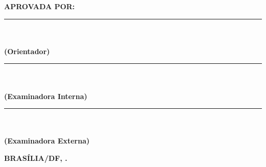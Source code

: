 \begin{folhadeaprovacao}
\begin{center}
	\vspace{10mm}
	{\large \textbf{\imprimirautor}}
\end{center}
 
\vspace{10mm}

\noindent
\MakeUppercase{\textbf{\imprimirpreambulo}}

\vspace{5mm}

\noindent
\MakeUppercase{\textbf{Aprovada por:}}

\vspace{10mm}

\noindent\rule{120mm}{0.1mm}\\
{\textbf{\imprimirorientador}}\\
{\textbf{\noindent (Orientador)}}

\vspace{7.5mm}

\noindent\rule{120mm}{0.1mm}\\
{\textbf{\imprimirmembroconvidadoum}}\\
{\textbf{\noindent (Examinadora Interna)}}

\vspace{7.5mm}

\noindent\rule{120mm}{0.1mm}\\
{\textbf{\imprimirmembroconvidadodois}}\\
{\textbf{\noindent (Examinadora Externa)}}



\vspace{7.5mm}
\noindent
\MakeUppercase{\textbf{Brasília/DF, \imprimirdata.}}

\pagebreak
 
\end{folhadeaprovacao}
